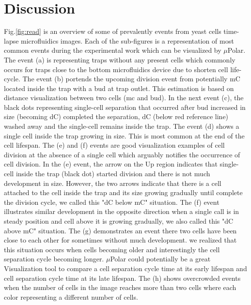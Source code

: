 \documentclass[conference]{IEEEtran}
\begin{document}
\section{Discussion}

Fig.\ref{fig:read} is an overview of some of prevalently events from yeast cells time-lapse microfluidics images. Each of the sub-figures is a representation of most common events during the experimental work which can be visualized by $\mu$Polar. The event (a) is representing traps without any present cells which commonly occurs for traps close to the bottom microfluidics device due to shorten cell life-cycle. The event (b) portends the upcoming division event from potentially mC located inside the trap with a bud at trap outlet. This estimation is based on distance visualization between two cells (mc and bud). In the next event (c), the black dots representing single-cell separation that occurred after bud increased in size (becoming dC) completed the separation, dC (below red reference line) washed away and the single-cell remains inside the trap. The event (d) shows a single cell inside the trap growing in size. This is most common at the end of the cell lifespan. The (e) and (f) events are good visualization examples of cell division at the absence of a single cell which arguably notifies the occurrence of cell division. In the (e) event, the arrow on the Up region indicates that single-cell inside the trap (black dot) started division and there is not much development in size. However, the two arrows indicate that there is a cell attached to the cell inside the trap and its size growing gradually until complete the division cycle, we called this "dC below mC" situation. The (f) event illustrates similar development in the opposite direction when a single call is in steady position and cell above it is growing gradually, we also called this "dC above mC" situation. The (g) demonstrates an event there two cells have been close to each other for sometimes without much development. we realized that this situation occurs when cells becoming older and interestingly the cell separation cycle becoming longer. $\mu$Polar could potentially be a great Visualization tool to compare a cell separation cycle time at its early lifespan and cell separation cycle time at its late lifespan. The (h) shows overcrowded events when the number of cells in the image reaches more than two cells where each color representing a different number of cells.
\end{document}
